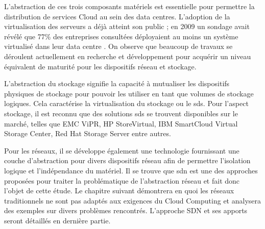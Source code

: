 L'abstraction de ces trois composants matériels est essentielle pour permettre la distribution de services Cloud au sein des data centres. L'adoption de la virtualisation des serveurs a déjà atteint son public ; en 2009 un sondage avait révélé que 77\% des entreprises consultées déployaient au moins un système virtualisé dans leur data centre \cite{x86ServersVirtualization}. On observe que beaucoup de travaux se déroulent actuellement en recherche et développement pour acquérir un niveau équivalent de maturité pour les dispositifs réseau et stockage. 

L'abstraction du stockage signifie la capacité à mutualiser les dispositifs physiques de stockage pour pouvoir les utiliser en tant que volumes de stockage logiques. Cela caractérise la virtualisation du stockage ou le \gls{sds}. Pour l'aspect stockage, il est reconnu que des solutions \gls{sds} se trouvent disponibles sur le marché, telles que EMC ViPR, HP StoreVirtual, IBM SmartCloud Virtual Storage Center, Red Hat Storage Server entre autres.

Pour les réseaux, il se développe également une technologie fournissant une couche d'abstraction pour divers dispositifs réseau afin de permettre l'isolation logique et l'indépendance du matériel. Il se trouve que \gls{sdn} est une des approches proposées pour traiter la problématique de l'abstraction réseau et fait donc l'objet de cette étude. Le chapitre suivant démontrera en quoi les réseaux traditionnels ne sont pas adaptés aux exigences du Cloud Computing et analysera des exemples sur divers problèmes rencontrés. L'approche SDN et ses apports seront détaillés en dernière partie. \cite{journeySDDC} \cite{ciscoCCDCStrategyArchiSolutions} \cite{ibmPlanningVirtCCchap1}  \cite{cloudReadyJuniperReferenceDef}

